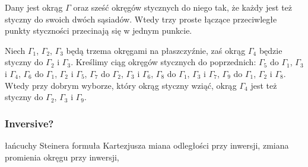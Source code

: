 \begin{proposition}
	Dany jest okrąg $\Gamma$ oraz sześć okręgów stycznych do niego tak, że każdy jest też styczny do swoich dwóch sąsiadów.
	Wtedy trzy proste łączące przeciwległe punkty styczności przecinają się w jednym punkcie.
\end{proposition}

\begin{proposition}
	Niech $\Gamma_1$, $\Gamma_2$, $\Gamma_3$ będą trzema okręgami na płaszczyźnie, zaś okrąg $\Gamma_4$ będzie styczny do $\Gamma_2$ i $\Gamma_3$.
	Kreślimy ciąg okręgów stycznych do poprzednich:
	$\Gamma_5$ do $\Gamma_1$, $\Gamma_3$ i $\Gamma_4$,
	$\Gamma_6$ do $\Gamma_1$, $\Gamma_2$ i $\Gamma_5$,
	$\Gamma_7$ do $\Gamma_2$, $\Gamma_3$ i $\Gamma_6$,
	$\Gamma_8$ do $\Gamma_1$, $\Gamma_3$ i $\Gamma_7$,
	$\Gamma_9$ do $\Gamma_1$, $\Gamma_2$ i $\Gamma_8$.
	Wtedy przy dobrym wyborze, który okrąg styczny wziąć, okrąg $\Gamma_4$ jest też styczny do $\Gamma_2$, $\Gamma_3$ i $\Gamma_9$.
\end{proposition}

\subsubsection{Inversive?}
łańcuchy Steinera %
formuła Kartezjusza %
miana odległości przy inwersji, zmiana promienia okręgu przy inwersji, %

